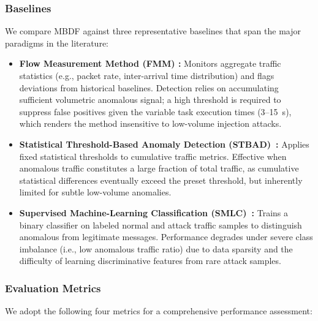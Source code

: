 \documentclass[manuscript,screen,review]{acmart}
\begin{document}
\subsubsection{Baselines}
\label{sec:baselines}

We compare MBDF against three representative baselines
that span the major paradigms in the literature:

\begin{itemize}
\item \textbf{Flow Measurement Method (FMM)%
      \cite{ref24,ref25}:}
Monitors aggregate traffic statistics (e.g., packet rate,
inter-arrival time distribution) and flags deviations
from historical baselines. Detection relies on
accumulating sufficient volumetric anomalous signal;
a high threshold is required to suppress false positives
given the variable task execution times (3--15~s),
which renders the method insensitive to low-volume
injection attacks.

\item \textbf{Statistical Threshold-Based Anomaly
Detection (STBAD)~\cite{ref8}:}
Applies fixed statistical thresholds to cumulative
traffic metrics. Effective when anomalous traffic
constitutes a large fraction of total traffic, as
cumulative statistical differences eventually exceed
the preset threshold, but inherently limited for
subtle low-volume anomalies.

\item \textbf{Supervised Machine-Learning Classification
(SMLC)~\cite{ref10,ref11}:}
Trains a binary classifier on labeled normal and attack
traffic samples to distinguish anomalous from legitimate
messages. Performance degrades under severe class
imbalance (i.e., low anomalous traffic ratio) due to
data sparsity and the difficulty of learning
discriminative features from rare attack samples.
\end{itemize}

\subsubsection{Evaluation Metrics}
\label{sec:metrics}

We adopt the following four metrics for a comprehensive
performance assessment:
\end{document}
